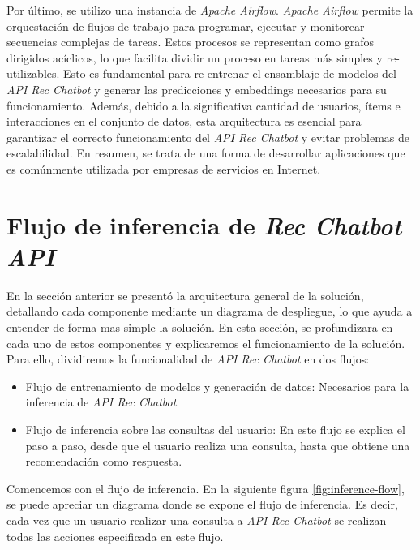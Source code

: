 \documentclass[11pt,a4paper,twoside]{thesis}
\begin{document}
Por último, se utilizo una instancia de \textit{Apache Airflow}. \textit{Apache Airflow} permite la orquestación de flujos de trabajo para programar, ejecutar y monitorear secuencias complejas de tareas. Estos procesos se representan como grafos dirigidos acíclicos, lo que facilita dividir un proceso en tareas más simples y re-utilizables. Esto es fundamental para re-entrenar el ensamblaje de modelos del \textit{API Rec Chatbot} y generar las predicciones y embeddings necesarios para su funcionamiento. Además, debido a la significativa cantidad de usuarios, ítems e interacciones en el conjunto de datos, esta arquitectura es esencial para garantizar el correcto funcionamiento del \textit{API Rec Chatbot} y evitar problemas de escalabilidad. En resumen, se trata de una forma de desarrollar aplicaciones que es comúnmente utilizada por empresas de servicios en Internet.

\chapter{Flujo de inferencia de \textit{Rec Chatbot API}}

En la sección anterior se presentó la arquitectura general de la solución, detallando cada componente mediante un diagrama de despliegue, lo que ayuda a entender de forma mas simple la solución. En esta sección, se profundizara en cada uno de estos componentes y explicaremos el funcionamiento de la solución. Para ello, dividiremos la funcionalidad de \textit{API Rec Chatbot} en dos flujos:

\begin{itemize}
	\setlength{\itemsep}{0pt}
	\setlength{\parskip}{0pt}

	\item Flujo de entrenamiento de modelos y generación de datos: Necesarios para la inferencia de \textit{API Rec Chatbot}.
	\item Flujo de inferencia sobre las consultas del usuario: En este flujo se explica el paso a paso, desde que el usuario realiza una consulta, hasta que obtiene una recomendación como respuesta.
\end{itemize}

Comencemos con el flujo de inferencia. En la siguiente figura \ref{fig:inference-flow}, se puede apreciar un diagrama donde se expone el flujo de inferencia. Es decir, cada vez que un usuario realizar una consulta a \textit{API Rec Chatbot} se realizan todas las acciones especificada en este flujo.
\vfill
\end{document}
